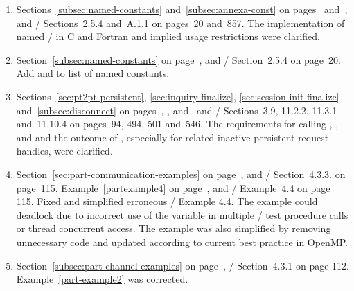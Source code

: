 \begin{enumerate}
\item
  Sections~\ref{subsec:named-constants} and~\ref{subsec:annexa-const} on pages~\pageref{subsec:named-constants} and~\pageref{subsec:annexa-const}, and
  \MPIIVDOTO/ Sections~2.5.4 and~A.1.1 on pages~20 and~857.
  \newline
  The implementation of named \MPI/  in C and Fortran and implied usage restrictions were clarified.

\item
  Section~\ref{subsec:named-constants} on page~\pageref{subsec:named-constants}, and \MPIIVDOTO/ Section~2.5.4 on page~20.
  \newline
  Add  and  to list of named constants.

\item \label{item:changes:issue710-PR823}
  Sections~\ref{sec:pt2pt-persistent}, \ref{sec:inquiry-finalize}, \ref{sec:session-init-finalize} and~\ref{subsec:disconnect} 
  on pages~\pageref{sec:pt2pt-persistent}, \pageref{sec:inquiry-finalize}, \pageref{sec:session-init-finalize} and~\pageref{subsec:disconnect}
  and \MPIIVDOTO/ Sections~3.9, 11.2.2, 11.3.1 and~11.10.4 on pages~94, 494, 501 and~546.
  \newline
  The requirements for calling , , and  
  and the outcome of , especially for related
  inactive persistent request handles, were clarified.
  
\item
  Section~\ref{sec:part-communication-examples} on page~\pageref{sec:part-communication-examples}, and
  \MPIIVDOTO/ Section~4.3.3. on page~115.
  Example~\ref{partexample4} on page~\pageref{partexample4}, and
  \MPIIVDOTO/ Example~4.4 on page 115. 
  \newline
  Fixed and simplified erroneous \MPIIVDOTO/ Example 4.4. The example could deadlock due to
  incorrect use of the  variable in multiple \MPI/ test procedure calls or
  thread concurrent access.
  The example was also simplified by removing unnecessary code and updated according to current
  best practice in OpenMP.

\item 
Section~\ref{subsec:part-channel-examples} on page~\pageref{subsec:part-channel-examples}, \MPIIV/ Section~4.3.1 on page 112.
\newline
Example~\ref{part-example2} was corrected.


\end{enumerate}
